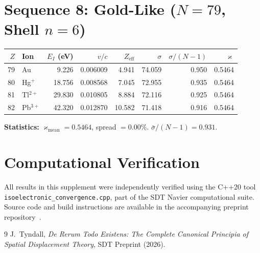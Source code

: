 \documentclass{article}
\newcommand{\kop}{\varkappa}
\begin{document}
\section{Sequence 8: Gold-Like ($N = 79$, Shell $n = 6$)}

\begin{center}
\begin{tabular}{rlrrrrrr}
\toprule
$Z$ & Ion & $E_I$ (eV) & $v/c$ & $Z_{\text{eff}}$ & $\sigma$ & $\sigma/(N{-}1)$ & $\kop$ \\
\midrule
79 & Au          &    9.226 & 0.006009 &  4.941 & 74.059 & 0.950 & 0.5464 \\
80 & Hg$^+$      &   18.756 & 0.008568 &  7.045 & 72.955 & 0.935 & 0.5464 \\
81 & Tl$^{2+}$   &   29.830 & 0.010805 &  8.884 & 72.116 & 0.925 & 0.5464 \\
82 & Pb$^{3+}$   &   42.320 & 0.012870 & 10.582 & 71.418 & 0.916 & 0.5464 \\
\bottomrule
\end{tabular}
\end{center}

\textbf{Statistics:} $\kop_{\text{mean}} = 0.5464$, spread $= 0.00\%$.  $\bar{\sigma}/(N{-}1) = 0.931$.


\section{Computational Verification}

All results in this supplement were independently verified using the C++20 tool \texttt{isoelectronic\_convergence.cpp}, part of the SDT Navier computational suite.  Source code and build instructions are available in the accompanying preprint repository~\cite{tyndall2026sdt}.

\begin{thebibliography}{9}
J.~Tyndall,
\emph{De Rerum Todo Existens: The Complete Canonical Principia of Spatial Displacement Theory},
SDT Preprint (2026).
\end{thebibliography}
\end{document}
